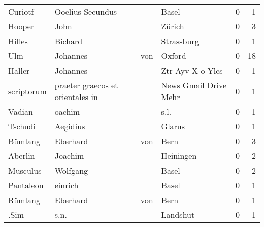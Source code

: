 \begin{center}
\begin{tiny}
\begin{longtabu}{llllrr}
                  Curiotf &                   Ooelius Secundus &             &                                       Basel &          0 &         1 \\
                   Hooper &                               John &             &                                      Zürich &          0 &         3 \\
                   Hilles &                            Bichard &             &                                  Strassburg &          0 &         1 \\
                      Ulm &                           Johannes &         von &                                      Oxford &          0 &        18 \\
                   Haller &                           Johannes &             &                            Ztr Ayv X o Ylcs &          0 &         1 \\
               scriptorum &   praeter graecos et orientales in &             &                       News Gmail Drive Mehr &          0 &         1 \\
                   Vadian &                             oachim &             &                                        s.l. &          0 &         1 \\
                  Tschudi &                           Aegidius &             &                                      Glarus &          0 &         1 \\
                  Bümlang &                           Eberhard &         von &                                        Bern &          0 &         3 \\
                  Aberlin &                            Joachim &             &                                   Heiningen &          0 &         2 \\
                 Musculus &                           Wolfgang &             &                                       Basel &          0 &         2 \\
                Pantaleon &                            einrich &             &                                       Basel &          0 &         1 \\
                  Rümlang &                           Eberhard &         von &                                        Bern &          0 &         1 \\
                     .Sim &                               s.n. &             &                                    Landshut &          0 &         1 \\

\end{longtabu}
\end{tiny}
\end{center}
